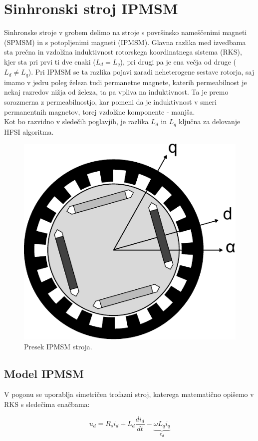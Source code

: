 \documentclass[a4paper,twoside,openright,12pt,slovene]{book}
\begin{document}

\chapter{Sinhronski stroj IPMSM} \label{sinhronskiStroj}

Sinhronske stroje v grobem delimo na stroje s površinsko nameščenimi magneti (SPMSM) in s potopljenimi magneti (IPMSM). Glavna razlika med izvedbama sta prečna in vzdolžna induktivnost rotorskega
koordinatnega sistema (RKS), kjer sta pri prvi ti dve enaki ($L_d = L_q$), pri drugi pa je ena večja od druge ($L_d \neq L_q$). Pri IPMSM se ta razlika pojavi zaradi neheterogene sestave rotorja, saj
imamo v jedru poleg železa tudi permanetne magnete, katerih permeabilnost je nekaj razredov nižja od železa, ta pa vpliva na induktivnost. Ta je premo sorazmerna z permeabilnostjo, kar pomeni da je
induktivnost v smeri permanentnih magnetov, torej vzdolžne komponente - manjša. 
\\
Kot bo razvidno v sledečih poglavjih, je razlika $L_d$ in $L_q$ ključna za delovanje HFSI algoritma. 

\begin{figure}[!htbp]
    \centering
    \includegraphics[width=0.5\columnwidth]{Slike/Inkscape/IPMSM.pdf}
    \caption{\label{IPMSM} Presek IPMSM stroja.}
\end{figure}


\section{Model IPMSM} \label{motor}

V pogonu se uporablja simetričen trofazni stroj, katerega matematično opišemo v RKS s sledečima enačbama:

\begin{equation} \label{motorModelD}
    u_d = R_si_d+L_d\frac{di_d}{dt}-\underbrace{\omega L_qi_q}_{e_d}
\end{equation}
\end{document}
